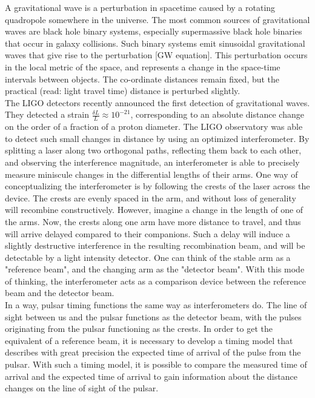 \documentclass[12pt]{article}
\begin{document}
A gravitational wave is a perturbation in spacetime caused by a rotating
quadropole somewhere in the universe. The most common sources of gravitational
waves are black hole binary systems, especially supermassive black hole binaries
that occur in galaxy collisions. Such binary systems emit sinusoidal
gravitational waves that give rise to the perturbation [GW equation].
This perturbation occurs in the local metric of the space, and represents a
change in the space-time intervals between objects. The co-ordinate distances
remain fixed, but the practical (read: light travel time) distance is perturbed
slightly.
\\
The LIGO detectors recently announced the first detection of gravitational
waves. They detected a strain $\frac{\delta L}{L} \approx 10^{-21}$, corresponding to an absolute
distance change on the order of a fraction of a proton diameter. The LIGO
observatory was able to detect such small changes in distance by using an
optimized interferometer. By splitting a laser along two orthogonal paths,
reflecting them back to each other, and observing the interference magnitude, an
interferometer is able to precisely measure miniscule changes in the
differential lengths of their arms. One way of conceptualizing the
interferometer is by following the crests of the laser across the device. The
crests are evenly spaced in the arm, and without loss of generality will
recombine constructively. However, imagine a change in the length of one of the
arms. Now, the crests along one arm have more distance to travel, and thus will
arrive delayed compared to their companions. Such a delay will induce a slightly
destructive interference in the resulting recombination beam, and will be
detectable by a light intensity detector. One can think of the stable arm as a
"reference beam", and the changing arm as the "detector beam". With this mode of
thinking, the interferometer acts as a comparison device between the reference
beam and the detector beam.
\\
In a way, pulsar timing functions the same way as interferometers do. The line
of sight between us and the pulsar functions as the detector beam, with the
pulses originating from the pulsar functioning as the crests. In order to get
the equivalent of a reference beam, it is necessary to develop a timing model
that describes with great precision the expected time of arrival of the pulse
from the pulsar. With such a timing model, it is possible to compare the
measured time of arrival and the expected time of arrival to gain information
about the distance changes on the line of sight of the pulsar.
\end{document}
